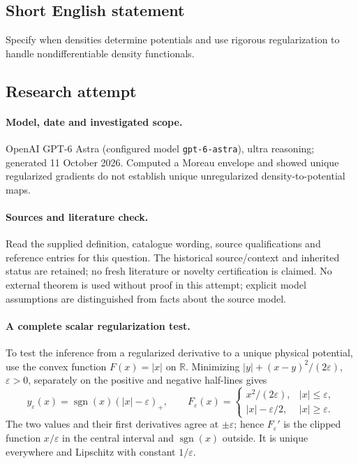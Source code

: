 \documentclass[11pt]{article}
\begin{document}
\subsection{Short English statement}
Specify when densities determine potentials and use rigorous regularization to handle nondifferentiable density functionals.
\subsection{Research attempt}
\paragraph{Model, date and investigated scope.}
OpenAI GPT-6 Astra (configured model \texttt{gpt-6-astra}), ultra reasoning; generated 11 October 2026. Computed a Moreau envelope and showed unique regularized gradients do not establish unique unregularized density-to-potential maps.

\paragraph{Sources and literature check.}
Read the supplied definition, catalogue wording, source qualifications and reference entries for this question. The historical source/context and inherited status are retained; no fresh literature or novelty certification is claimed. No external theorem is used without proof in this attempt; explicit model assumptions are distinguished from facts about the source model.

\paragraph{A complete scalar regularization test.} To test the inference from a regularized derivative to a unique physical potential, use the convex function \(F(x)=|x|\) on \(\mathbb R\). Minimizing \(|y|+(x-y)^2/(2\varepsilon)\), \(\varepsilon>0\), separately on the positive and negative half-lines gives
\[
 y_\varepsilon(x)=\operatorname{sgn}(x)(|x|-\varepsilon)_+,
 \qquad
 F_\varepsilon(x)=\begin{cases}x^2/(2\varepsilon),&|x|\le\varepsilon,\\|x|-\varepsilon/2,&|x|\ge\varepsilon.\end{cases}
\]
The two values and their first derivatives agree at \(\pm\varepsilon\); hence \(F_\varepsilon'\) is the clipped function \(x/\varepsilon\) in the central interval and \(\operatorname{sgn}(x)\) outside. It is unique everywhere and Lipschitz with constant \(1/\varepsilon\).
\end{document}
